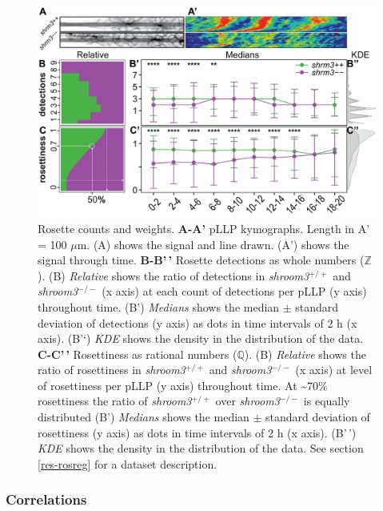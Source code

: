 \documentclass[10pt, b5paper, singlespacinge, twoside]{reedthesis} %
\theoremstyle{definition}
\theoremstyle{definition}
\theoremstyle{definition}
\theoremstyle{remark}
\begin{document}
\begin{figure}

{\centering \includegraphics[width=0.95\linewidth]{figures/results/03_rosettes/detection} 

}

\caption[Rosette counts and weights]{Rosette counts and weights. \textbf{A-A'} pLLP kymographs. Length in A' = 100 \(\mu\)m. (A) shows the signal and line drawn. (A') shows the signal through time. \textbf{B-B'\,'} Rosette detections as whole numbers (\(\mathbb{Z}\)). (B) \emph{Relative} shows the ratio of detections in \emph{shroom3}\(^{+/+}\) and \emph{shroom3}\(^{-/-}\) (x axis) at each count of detections per pLLP (y axis) throughout time. (B') \emph{Medians} shows the median \(\pm\) standard deviation of detections (y axis) as dots in time intervals of 2 h (x axis). (B'`) \emph{KDE} shows the density in the distribution of the data. \textbf{C-C'\,'} Rosettiness as rational numbers (\(\mathbb{Q}\)). (B) \emph{Relative} shows the ratio of rosettiness in \emph{shroom3}\(^{+/+}\) and \emph{shroom3}\(^{-/-}\) (x axis) at level of rosettiness per pLLP (y axis) throughout time. At \textasciitilde70\(\%\) rosettiness the ratio of \emph{shroom3}\(^{+/+}\) over \emph{shroom3}\(^{-/-}\) is equally distributed (B') \emph{Medians} shows the median \(\pm\) standard deviation of rosettiness (y axis) as dots in time intervals of 2 h (x axis). (B'\,') \emph{KDE} shows the density in the distribution of the data. See section \ref{res-rosreg} for a dataset description.}\label{fig:rdtdet}
\end{figure}
\hypertarget{correlations}{%
\subsubsection{Correlations}\label{correlations}}
\end{document}

